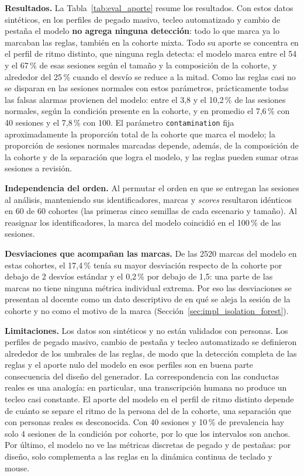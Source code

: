 \textbf{Resultados.} La Tabla~\ref{tab:eval_aporte} resume los resultados. Con estos datos sintéticos, en los perfiles de pegado masivo, tecleo automatizado y cambio de pestaña el modelo \textbf{no agrega ninguna detección}: todo lo que marca ya lo marcaban las reglas, también en la cohorte mixta. Todo su aporte se concentra en el perfil de ritmo distinto, que ninguna regla detecta: el modelo marca entre el 54 y el 67\,\% de esas sesiones según el tamaño y la composición de la cohorte, y alrededor del 25\,\% cuando el desvío se reduce a la mitad. Como las reglas casi no se disparan en las sesiones normales con estos parámetros, prácticamente todas las falsas alarmas provienen del modelo: entre el 3,8 y el 10,2\,\% de las sesiones normales, según la condición presente en la cohorte, y en promedio el 7,6\,\% con 40 sesiones y el 7,8\,\% con 100. El parámetro \texttt{contamination} fija aproximadamente la proporción total de la cohorte que marca el modelo; la proporción de sesiones normales marcadas depende, además, de la composición de la cohorte y de la separación que logra el modelo, y las reglas pueden sumar otras sesiones a revisión.

\textbf{Independencia del orden.} Al permutar el orden en que se entregan las sesiones al análisis, manteniendo sus identificadores, marcas y \textit{scores} resultaron idénticos en 60 de 60 cohortes (las primeras cinco semillas de cada escenario y tamaño). Al reasignar los identificadores, la marca del modelo coincidió en el 100\,\% de las sesiones.

\textbf{Desviaciones que acompañan las marcas.} De las 2520 marcas del modelo en estas cohortes, el 17,4\,\% tenía su mayor desviación respecto de la cohorte por debajo de 2 desvíos estándar y el 0,2\,\% por debajo de 1,5: una parte de las marcas no tiene ninguna métrica individual extrema. Por eso las desviaciones se presentan al docente como un dato descriptivo de en qué se aleja la sesión de la cohorte y no como el motivo de la marca (Sección~\ref{sec:impl_isolation_forest}).

\textbf{Limitaciones.} Los datos son sintéticos y no están validados con personas. Los perfiles de pegado masivo, cambio de pestaña y tecleo automatizado se definieron alrededor de los umbrales de las reglas, de modo que la detección completa de las reglas y el aporte nulo del modelo en esos perfiles son en buena parte consecuencia del diseño del generador. La correspondencia con las conductas reales es una analogía: en particular, una transcripción humana no produce un tecleo casi constante. El aporte del modelo en el perfil de ritmo distinto depende de cuánto se separe el ritmo de la persona del de la cohorte, una separación que con personas reales es desconocida. Con 40 sesiones y 10\,\% de prevalencia hay solo 4 sesiones de la condición por cohorte, por lo que los intervalos son anchos. Por último, el modelo no ve las métricas discretas de pegado y de pestañas: por diseño, solo complementa a las reglas en la dinámica continua de teclado y mouse.

